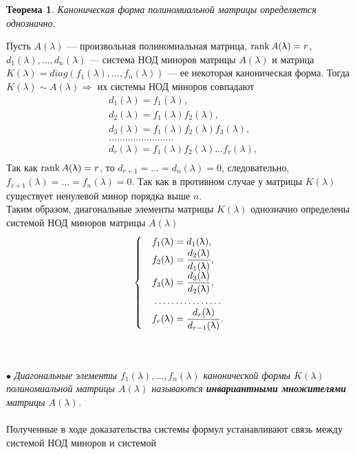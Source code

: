 \newtheorem*{th12_2_1}{Теорема}\begin{th12_2_1}Каноническая форма полиномиальной матрицы определяется однозначно.
\end{th12_2_1}\begin{Proof}
	Пусть $A(\lambda)$ --- произвольная полиномиальная матрица, $\operatorname{rank} A(\uplambda) = r$, $d_1(\lambda),\dots,d_n(\lambda)$ --- система НОД миноров матрицы $A(\lambda)$ и матрица $K(\lambda) = diag(f_1(\lambda),\dots,f_n(\lambda))$ --- ее некоторая каноническая форма. Тогда $K(\lambda)\sim A(\lambda) \Rightarrow$ их системы НОД миноров совпадают
	\begin{align*}
		&d_1(\lambda) = f_1(\lambda), \\
		&d_2(\lambda) = f_1(\lambda)f_2(\lambda),\\
		&d_3(\lambda)=f_1(\lambda)f_2(\lambda)f_3(\lambda),\\
		&\dots\dots\dots\dots\dots\dots\dots\dots\\
		&d_r(\lambda) = f_1(\lambda)f_2(\lambda)\dots f_r(\lambda),\\
	\end{align*}
	Так как $\operatorname{rank} A(\uplambda) = r$, то $d_{r+1}=\ldots=d_n(\lambda) = 0$, следовательно,  $f_{r+1}(\lambda) = \ldots = f_n(\lambda) = 0$. Так как в противном случае у матрицы $K(\lambda)$ существует ненулевой минор порядка выше $n$.\\
	Таким образом, диагональные элементы матрицы $K(\lambda)$ однозначно определены системой НОД миноров матрицы $A(\lambda)$\\
	$$\begin{cases}
		&f_1(\lambda) = d_1(\lambda),\\
		&f_2(\lambda) = \dfrac{d_2(\lambda)}{d_1(\lambda)},\\
		&f_3(\lambda) = \dfrac{d_3(\lambda)}{d_2(\lambda)},\\
		&\dotfill\\
		&f_r(\lambda) = \dfrac{d_r(\lambda)}{d_{r-1}(\lambda)}.
	\end{cases}$$
\end{Proof}\\\\
$\bullet$ \textit{Диагональные элементы $f_1(\lambda),\dots,f_n(\lambda)$ канонической формы $K(\lambda)$ полиномиальной матрицы $A(\lambda)$ называются \textbf{инвариантными множителями} матрицы $A(\lambda)$.}\\\\
Полученные в ходе доказательства системы формул устанавливают связь между системой НОД миноров и системой
